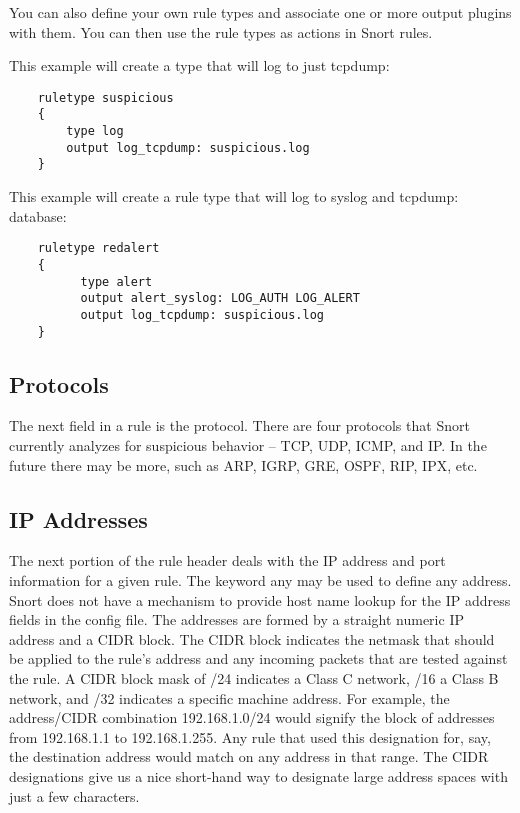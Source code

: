 \documentclass[english]{report}
\begin{document}
You can also define your own rule types and associate one or more output
plugins with them. You can then use the rule types as actions in Snort rules.

This example will create a type that will log to just tcpdump:

\begin{verbatim}
    ruletype suspicious
    {
        type log 
        output log_tcpdump: suspicious.log
    }
\end{verbatim}

This example will create a rule type that will log to syslog and tcpdump:
database:

\begin{verbatim}
    ruletype redalert
    {
          type alert 
          output alert_syslog: LOG_AUTH LOG_ALERT 
          output log_tcpdump: suspicious.log
    }
\end{verbatim}

\subsection{Protocols}

The next field in a rule is the protocol. There are four protocols that Snort
currently analyzes for suspicious behavior -- TCP, UDP, ICMP, and IP. In the
future there may be more, such as ARP, IGRP, GRE, OSPF, RIP, IPX, etc.

\subsection{IP Addresses}

The next portion of the rule header deals with the IP address and port
information for a given rule. The keyword any may be used to define any
address. Snort does not have a mechanism to provide host name lookup for the IP
address fields in the config file. The addresses are formed by a straight
numeric IP address and a CIDR\cite{cidrnotation} block. The CIDR block
indicates the netmask that should be applied to the rule's address and any
incoming packets that are tested against the rule. A CIDR block mask of /24
indicates a Class C network, /16 a Class B network, and /32 indicates a
specific machine address. For example, the address/CIDR combination
192.168.1.0/24 would signify the block of addresses from 192.168.1.1 to
192.168.1.255.  Any rule that used this designation for, say, the destination
address would match on any address in that range. The CIDR designations give us
a nice short-hand way to designate large address spaces with just a few
characters.
\end{document}
